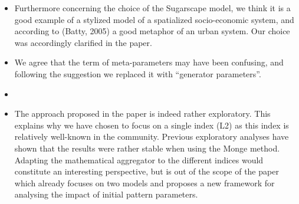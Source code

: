 \documentclass[11pt,a4paper,sans]{moderncv}        %
\begin{document}
\begin{itemize}
	\item Furthermore concerning the choice of the Sugarscape model, we think it is a good example of a stylized model of a spatialized socio-economic system, and according to (Batty, 2005) a good metaphor of an urban system. Our choice was accordingly clarified in the paper.
	
	\item We agree that the term of meta-parameters may have been confusing, and following the suggestion we replaced it with ``generator parameters''.

	

	
	\item {}
	
	\item The approach proposed in the paper is indeed rather exploratory. This explains why we have chosen to focus on a single index (L2) as this index is relatively well-known in the community. Previous exploratory analyses have shown that the results were rather stable when using the Monge method. Adapting the mathematical aggregator to the different indices would constitute an interesting perspective, but is out of the scope of the paper which already focuses on two models and proposes a new framework for analysing the impact of initial pattern parameters.
	

\end{itemize}
\end{document}

